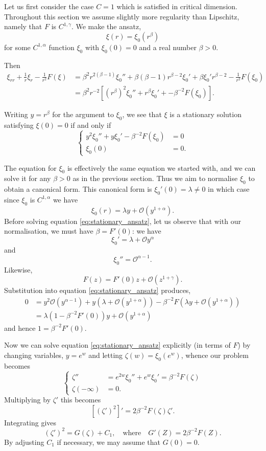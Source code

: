 \documentclass{amsart}
\begin{document}
Let us first consider the case \(C = 1\) which is satisfied in critical dimension. Throughout this section we assume slightly more regularity than Lipschitz, namely that \(F\) is \(C^{1,\gamma}\).  We make the ansatz,
\[
\xi(r) = \xi_0(r^{\beta})
\]
for some \(C^{1,\alpha}\) function \(\xi_0\) with \(\xi_0(0) = 0\) and a real number \(\beta > 0\).

Then
\[
\begin{split}
\xi_{rr} + \frac{1}{r} \xi_r - \frac{1}{r^2} F(\xi) &= \beta^2 r^{2(\beta-1)} \xi_0'' + \beta (\beta - 1) r^{\beta-2} \xi_0' + \beta \xi_0' r^{\beta-2} - \frac{1}{r^2} F(\xi_0) \\
&= \beta^2 r^{-2} \left[(r^{\beta})^2 \xi_0'' + r^{\beta} \xi_0' + - \beta^{-2}F(\xi_0)\right].
\end{split}
\]

Writing \(y = r^{\beta}\) for the argument to \(\xi_0\), we see that \(\xi\) is a stationary solution satisfying \(\xi(0) = 0\) if and only if
\begin{equation}
\label{eq:stationary_ansatz}
\begin{cases}
y^2 \xi_0'' + y \xi_0' - \beta^{-2} F(\xi_0) &= 0 \\
\xi_0(0) &= 0.
\end{cases}
\end{equation}

The equation for \(\xi_0\) is effectively the same equation we started with, and we can solve it for any \(\beta > 0\) as in the previous section. Thus we aim to normalise \(\xi_0\) to obtain a canonical form. This canonical form is \(\xi_0'(0) = \lambda \ne 0\) in which case since \(\xi_0\) is \(C^{1,\alpha}\) we have
\[
\xi_0(r) = \lambda y + \mathcal{O}(y^{1+\alpha}).
\]
Before solving equation \eqref{eq:stationary_ansatz}, let us observe that with our normalisation, we must have \(\beta = F'(0)\): we have
\[
\xi_0' = \lambda + \mathcal{O}y^{\alpha}
\]
and
\[
\xi_0'' = \mathcal{O}^{\alpha-1}.
\]
Likewise,
\[
F(z) = F'(0) z + \mathcal{O}(z^{1+\gamma}).
\]
Substitution into equation \eqref{eq:stationary_ansatz} produces,
\[
\begin{split}
0 &= y^2 \mathcal{O}(y^{\alpha-1}) + y \left(\lambda + \mathcal{O}(y^{1+\alpha})\right) - \beta^{-2} F(\lambda y + \mathcal{O} (y^{1 + \alpha})) \\
&= \lambda(1 - \beta^{-2} F'(0)) y + \mathcal{O}(y^{1+\alpha})
\end{split}
\]
and hence \(1 = \beta^{-2} F'(0)\).

Now we can solve equation \eqref{eq:stationary_ansatz} explicitly (in terms of \(F\)) by changing variables, \(y = e^w\) and letting \(\zeta(w) = \xi_0(e^w)\), whence our problem becomes
\[
\begin{cases}
\zeta'' &= e^{2w} \xi_0'' + e^w \xi_0' = \beta^{-2} F(\zeta) \\
\zeta(-\infty) &= 0.
\end{cases}
\]
Multiplying by \(\zeta'\) this becomes
\[
[(\zeta')^2]' = 2 \beta^{-2} F(\zeta) \zeta'.
\]
Integrating gives
\[
(\zeta')^2 = G(\zeta) + C_1, \quad \text{where} \quad G'(Z) = 2\beta^{-2} F(Z).
\]
By adjusting \(C_1\) if necessary, we may assume that \(G(0) = 0\).
\end{document}

